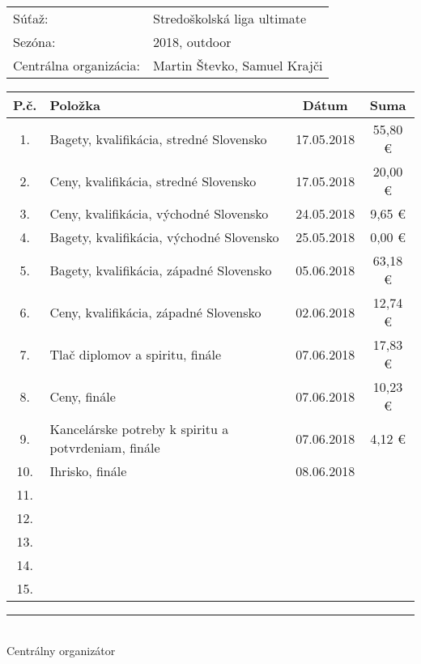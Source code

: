 \documentclass[12pt, a4paper]{article}
\begin{document}
\parskip=10pt
\begin{center}
\end{center}

\begin{tabular}{p{4.2cm} l}
Súťaž:&Stredoškolská liga ultimate\\
Sezóna:& 2018, outdoor\\
Centrálna organizácia:&Martin Števko, Samuel Krajči
\end{tabular}

\begin{center}
\begin{tabular}{|c|p{10cm}|c|c|}
\hline
P.č.&Položka&Dátum&Suma\\
\hline \hline
1. & Bagety, kvalifikácia, stredné Slovensko & 17.05.2018 & 55,80 \euro \\ \hline
2. & Ceny, kvalifikácia, stredné Slovensko & 17.05.2018 & 20,00 \euro \\ \hline
3. & Ceny, kvalifikácia, východné Slovensko & 24.05.2018 & 9,65 \euro \\ \hline
4. & Bagety, kvalifikácia, východné Slovensko & 25.05.2018 & 0,00 \euro \\ \hline
5. & Bagety, kvalifikácia, západné Slovensko & 05.06.2018 & 63,18 \euro \\ \hline
6. & Ceny, kvalifikácia, západné Slovensko & 02.06.2018 & 12,74 \euro \\ \hline
7. & Tlač diplomov a spiritu, finále & 07.06.2018 & 17,83 \euro \\ \hline
8. & Ceny, finále & 07.06.2018 & 10,23 \euro \\ \hline
9. & Kancelárske potreby k spiritu a potvrdeniam, finále & 07.06.2018 & 4,12 \euro \\ \hline
10. & Ihrisko, finále & 08.06.2018 &  \\ \hline
11. &  &  &  \\ \hline
12. &  &  &  \\ \hline
13. &  &  &  \\ \hline
14. &  &  &  \\ \hline
15. &  &  &  \\ \hline
\end{tabular}
\end{center}

\vfill
\begin{flushright}
\begin{minipage}{4.5cm}
\begin{center}
\rule{4.4cm}{0.7pt}\\
Centrálny organizátor
\end{center}
\end{minipage}
\end{flushright}
\end{document}

